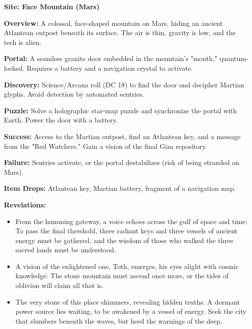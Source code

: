 \documentclass[12pt]{article}
\begin{document}
\textbf{Site: Face Mountain (Mars)}

\textbf{Overview:}  
A colossal, face-shaped mountain on Mars, hiding an ancient Atlantean outpost beneath its surface. The air is thin, gravity is low, and the tech is alien.

\textbf{Portal:}  
A seamless granite door embedded in the mountain's "mouth," quantum-locked. Requires a battery and a navigation crystal to activate.

\textbf{Discovery:}  
Science/Arcana roll (DC 18) to find the door and decipher Martian glyphs. Avoid detection by automated sentries.

\textbf{Puzzle:}  
Solve a holographic star-map puzzle and synchronize the portal with Earth. Power the door with a battery.

\textbf{Success:}  
Access to the Martian outpost, find an Atlantean key, and a message from the "Red Watchers." Gain a vision of the final Giza repository.

\textbf{Failure:}  
Sentries activate, or the portal destabilizes (risk of being stranded on Mars).

\textbf{Item Drops:}  
Atlantean key, Martian battery, fragment of a navigation map.

\textbf{Revelations:}
\begin{itemize}
  \item From the humming gateway, a voice echoes across the gulf of space and time: To pass the final threshold, three radiant keys and three vessels of ancient energy must be gathered, and the wisdom of those who walked the three sacred lands must be understood.
  \item A vision of the enlightened one, Toth, emerges, his eyes alight with cosmic knowledge: The stone mountain must ascend once more, or the tides of oblivion will claim all that is.
  \item The very stone of this place shimmers, revealing hidden truths: A dormant power source lies waiting, to be awakened by a vessel of energy. Seek the city that slumbers beneath the waves, but heed the warnings of the deep.
\end{itemize}
\end{document}
